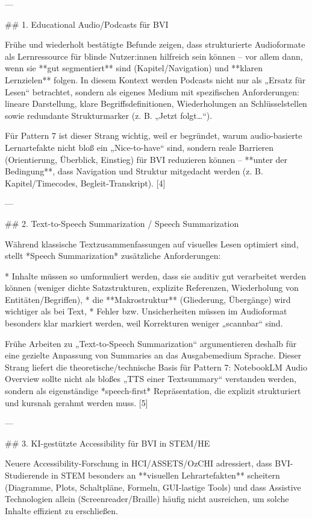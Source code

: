 ---

## 1. Educational Audio/Podcasts für BVI

Frühe und wiederholt bestätigte Befunde zeigen, dass strukturierte Audioformate als Lernressource für blinde Nutzer:innen hilfreich sein können – vor allem dann, wenn sie **gut segmentiert** sind (Kapitel/Navigation) und **klaren Lernzielen** folgen. In diesem Kontext werden Podcasts nicht nur als „Ersatz für Lesen“ betrachtet, sondern als eigenes Medium mit spezifischen Anforderungen: lineare Darstellung, klare Begriffsdefinitionen, Wiederholungen an Schlüsselstellen sowie redundante Strukturmarker (z. B. „Jetzt folgt…“).

Für Pattern 7 ist dieser Strang wichtig, weil er begründet, warum audio-basierte Lernartefakte nicht bloß ein „Nice-to-have“ sind, sondern reale Barrieren (Orientierung, Überblick, Einstieg) für BVI reduzieren können – **unter der Bedingung**, dass Navigation und Struktur mitgedacht werden (z. B. Kapitel/Timecodes, Begleit-Transkript). [4]

---

## 2. Text-to-Speech Summarization / Speech Summarization

Während klassische Textzusammenfassungen auf visuelles Lesen optimiert sind, stellt *Speech Summarization* zusätzliche Anforderungen:

* Inhalte müssen so umformuliert werden, dass sie auditiv gut verarbeitet werden können (weniger dichte Satzstrukturen, explizite Referenzen, Wiederholung von Entitäten/Begriffen),
* die **Makrostruktur** (Gliederung, Übergänge) wird wichtiger als bei Text,
* Fehler bzw. Unsicherheiten müssen im Audioformat besonders klar markiert werden, weil Korrekturen weniger „scannbar“ sind.

Frühe Arbeiten zu „Text-to-Speech Summarization“ argumentieren deshalb für eine gezielte Anpassung von Summaries an das Ausgabemedium Sprache. Dieser Strang liefert die theoretische/technische Basis für Pattern 7: NotebookLM Audio Overview sollte nicht als bloßes „TTS einer Textsummary“ verstanden werden, sondern als eigenständige *speech-first* Repräsentation, die explizit strukturiert und kursnah gerahmt werden muss. [5]

---

## 3. KI-gestützte Accessibility für BVI in STEM/HE

Neuere Accessibility-Forschung in HCI/ASSETS/OzCHI adressiert, dass BVI-Studierende in STEM besonders an **visuellen Lehrartefakten** scheitern (Diagramme, Plots, Schaltpläne, Formeln, GUI-lastige Tools) und dass Assistive Technologien allein (Screenreader/Braille) häufig nicht ausreichen, um solche Inhalte effizient zu erschließen.

